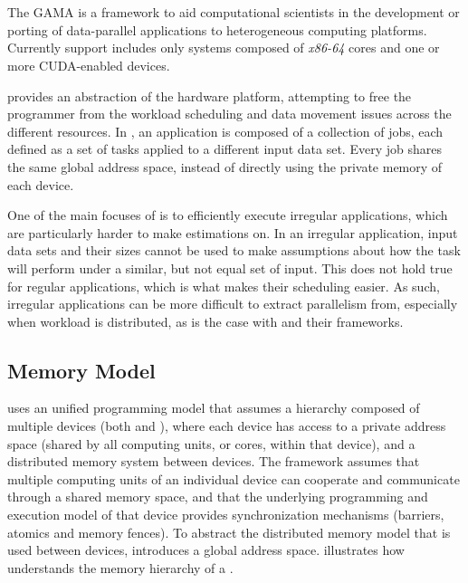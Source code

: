 \documentclass[main.tex]{subfiles}
\begin{document}
\section{\gama} \label{chapter:gama}

The \acf{GAMA} is a framework to aid computational scientists in the development or porting of data-parallel applications to heterogeneous computing platforms. Currently \hetplat support includes only systems composed of \textit{x86-64} \cpu cores and one or more CUDA-enabled \gpu devices.

\gama provides an abstraction of the hardware platform, attempting to free the programmer from the workload scheduling and data movement issues across the different resources. In \gama, an application is composed of a collection of jobs, each defined as a set of tasks applied to a different input data set. Every job shares the same global address space, instead of directly using the private memory of each device.

One of the main focuses of \gama is to efficiently execute irregular applications, which are particularly harder to make estimations on. In an irregular application, input data sets and their sizes cannot be used to make assumptions about how the task will perform under a similar, but not equal set of input. This does not hold true for regular applications, which is what makes their scheduling easier. As such, irregular applications can be more difficult to extract parallelism from, especially when workload is distributed, as is the case with \hetplats and their frameworks.


\subsection{Memory Model}

\gama uses an unified programming model that assumes a hierarchy composed of multiple devices (both \cpus and \gpus), where each device has access to a private address space (shared by all computing units, or cores, within that device), and a distributed memory system between devices. The framework assumes that multiple computing units of an individual device can cooperate and communicate through a shared memory space, and that the underlying programming and execution model of that device provides synchronization mechanisms (barriers, atomics and memory fences).
To abstract the distributed memory model that is used between devices, \gama introduces a global address space.  illustrates how \gama understands the memory hierarchy of a \hetplat.
\end{document}
